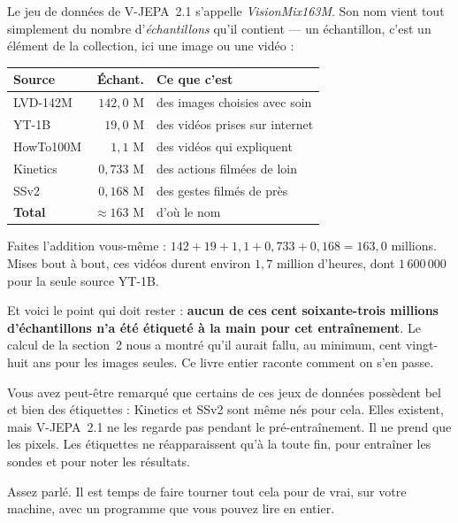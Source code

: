 \begin{surlesdonnees}
Le jeu de données de V-JEPA~2.1 s'appelle \emph{VisionMix163M}. Son nom vient
tout simplement du nombre d'\emph{échantillons} qu'il contient — un
échantillon, c'est un élément de la collection, ici une image ou une vidéo :

\begin{center}
\footnotesize
\begin{tabular}{lrl}
\toprule
\textbf{Source} & \textbf{Échant.} & \textbf{Ce que c'est} \\
\midrule
LVD-142M    & $142{,}0$ M & des images choisies avec soin \\
YT-1B       & $19{,}0$ M  & des vidéos prises sur internet \\
HowTo100M   & $1{,}1$ M   & des vidéos qui expliquent \\
Kinetics    & $0{,}733$ M & des actions filmées de loin \\
SSv2        & $0{,}168$ M & des gestes filmés de près \\
\midrule
\textbf{Total} & $\approx 163$ M & d'où le nom \\
\bottomrule
\end{tabular}
\end{center}

Faites l'addition vous-même :
$142 + 19 + 1{,}1 + 0{,}733 + 0{,}168 = 163{,}0$ millions. Mises bout à bout,
ces vidéos durent environ $1{,}7$ million d'heures, dont $1\,600\,000$ pour la
seule source YT-1B.

Et voici le point qui doit rester : \textbf{aucun de ces cent soixante-trois
millions d'échantillons n'a été étiqueté à la main pour cet entraînement}.
Le calcul de la section~2 nous a montré qu'il aurait fallu, au minimum, cent
vingt-huit ans pour les images seules. Ce livre entier raconte comment on
s'en passe.
\end{surlesdonnees}

\begin{remarque}
Vous avez peut-être remarqué que certains de ces jeux de données possèdent
bel et bien des étiquettes : Kinetics et SSv2 sont même nés pour cela. Elles
existent, mais V-JEPA~2.1 ne les regarde pas pendant le pré-entraînement. Il
ne prend que les pixels. Les étiquettes ne réapparaissent qu'à la toute fin,
pour entraîner les sondes et pour noter les résultats.
\end{remarque}

Assez parlé. Il est temps de faire tourner tout cela pour de vrai, sur votre
machine, avec un programme que vous pouvez lire en entier.

